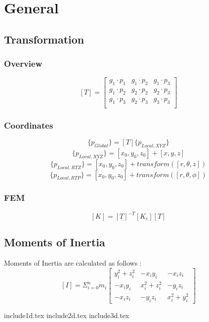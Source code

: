 \documentclass[a4paper,12pt]{article}
\begin{document}
\section{General}
   \subsection{Transformation}
     \subsubsection{Overview}
     \[ [T] = 
            \left[ \begin{array}{ccc}
               g_1 \cdot p_1 & g_1 \cdot p_2 & g_1 \cdot p_3 \\
               g_1 \cdot p_2 & g_2 \cdot p_2 & g_2 \cdot p_3 \\
               g_1 \cdot p_3 & g_2 \cdot p_3 & g_3 \cdot p_3 \\
            \end{array}\right]\]
     \subsubsection{Coordinates}
      \[ \{p_{Global}\}  = [T]\{p_{Local,XYZ}\} \]
      \[ \{p_{Local,XYZ}\} = [x_0,y_0,z_0]+[x,y,z] \]
      \[ \{p_{Local,RTZ}\} = [x_0,y_0,z_0]+transform([r,\theta,   z]) \]
      \[ \{p_{Local,RTP}\} = [x_0,y_0,z_0]+transform([r,\theta,\phi]) \]

     \subsubsection{FEM}

      \[ [K] = [T]^{-T} [K_e] [T]  \]

  \subsection{Moments of Inertia}
    Moments of Inertia are calculated as follows \cite{momentInertia}:
    \[ [I] = \Sigma_{i=0}^n m_i \left[ \begin{array}{ccc}
               y_i^2+z_i^2 & -x_i y_i    & -x_i z_i  \\
               -x_i y_i    & x_i^2+z_i^2 & -y_i z_i  \\
               -x_i z_i    & -y_i z_i    & x_i^2+y_i^2
            \end{array}\right]\]

include{1d.tex}
include{2d.tex}
include{3d.tex}



\end{document}
